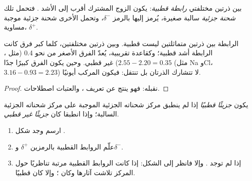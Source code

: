 \begin{definition}\label{def:g11:polarity-and-cohesion:polar-bond}
 بين ذرتين مختلفتي  \emph{رابطة قطبية}:
يكون الزوج المشترك أقرب إلى  الأشد . فتحمل تلك 
\emph{شحنة جزئية} سالبة صغيرة، يُرمز إليها بالرمز $\delta^-$،
وتحمل  الأخرى شحنة جزئية موجبة مساوية، $\delta^+$.
\end{definition}

\begin{proposition}\label{prop:g11:polarity-and-cohesion:polar-bond}
الرابطة بين ذرتين متماثلتين ليست قطبية. وبين ذرتين مختلفتين، كلما كبر فرق
 كانت الرابطة أشد قطبية؛ وكقاعدة تقريبية، يُعدّ الفرق الأصغر من نحو
0.4 (مثل ، $2.55 - 2.20 = 0.35$) غير قطبي. وحين يكون الفرق كبيرًا جدًا
(مثل Na وCl، $3.16 - 0.93 = 2.23$) لا تتشارك الذرتان  بل تنتقل:
فيكون المركب أيونيًا.
\end{proposition}

\begin{proof}
نقبله: فهو ينتج عن تعريف ، والعتبات
اصطلاحات.
\end{proof}

\begin{definition}\label{def:g11:polarity-and-cohesion:polar-molecule}
يكون  \emph{جزيئًا قطبيًا} إذا لم ينطبق مركز شحناته
الجزئية الموجبة على مركز شحناته الجزئية السالبة؛ وإذا انطبقا كان
\emph{جزيئًا غير قطبي}.
\end{definition}

\begin{method}\label{met:g11:polarity-and-cohesion:polar}
\begin{enumerate}
  \item ارسم  وجد شكل .
  \item علّم الروابط القطبية بالرمزين $\delta^+$ و$\delta^-$.
  \item إذا لم توجد  . وإلا فانظر إلى
        الشكل: إذا كانت الروابط القطبية مرتبة تناظريًا حول المركز تلاشت
        آثارها وكان ؛ وإلا كان
        قطبيًا.
\end{enumerate}
\end{method}

